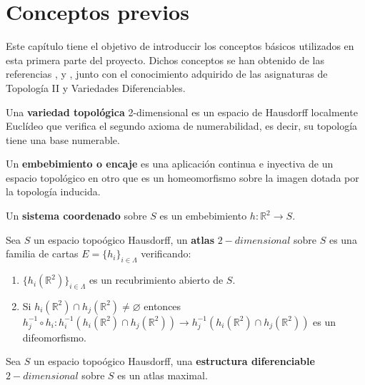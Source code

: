
\chapter{Conceptos previos}

Este capítulo tiene el objetivo de introduccir los conceptos básicos utilizados en esta primera parte del proyecto. Dichos conceptos se han obtenido de las referencias \cite{MorseTh1}, \cite{MorseTh2} y \cite{Triangulacion}, junto con el conocimiento adquirido de las asignaturas de Topología II y Variedades Diferenciables.

\begin{definicion} Una \textbf{variedad topológica} 2-dimensional es un espacio de Hausdorff localmente Euclídeo que verifica el segundo axioma de numerabilidad, es decir, su topología tiene una base numerable.
\end{definicion}

\begin{definicion} Un \textbf{embebimiento o encaje} es una aplicación continua e inyectiva de un espacio topológico en otro que es un homeomorfismo sobre la imagen dotada por la topología inducida.
\end{definicion}

\begin{definicion} Un \textbf{sistema coordenado} sobre $S$ es un embebimiento $h : \mathbb{R}^2 \rightarrow S$.
\end{definicion}

\begin{definicion} Sea $S$ un espacio topoógico Hausdorff, un \textbf{atlas} $2-dimensional$ sobre $S$ es una familia de cartas $E=\{h_i\}_{i\in \Lambda}$ verificando:
	\begin{enumerate}
		\item $\{h_i(\mathbb{R}^2)\}_{i\in \Lambda}$ es un recubrimiento abierto de $S$.
		\item Si $h_i(\mathbb{R}^2) \cap h_j(\mathbb{R}^2) \neq \varnothing$ entonces $h_j^{-1} \circ h_i:h_i^{-1}(h_i(\mathbb{R}^2)\cap h_j(\mathbb{R}^2)) \rightarrow h_j^{-1}(h_i(\mathbb{R}^2)\cap h_j(\mathbb{R}^2))$ es un difeomorfismo.
	\end{enumerate}
\end{definicion}

\begin{definicion} Sea $S$ un espacio topoógico Hausdorff, una \textbf{estructura diferenciable} $2-dimensional$ sobre $S$ es un atlas maximal.
\end{definicion}

